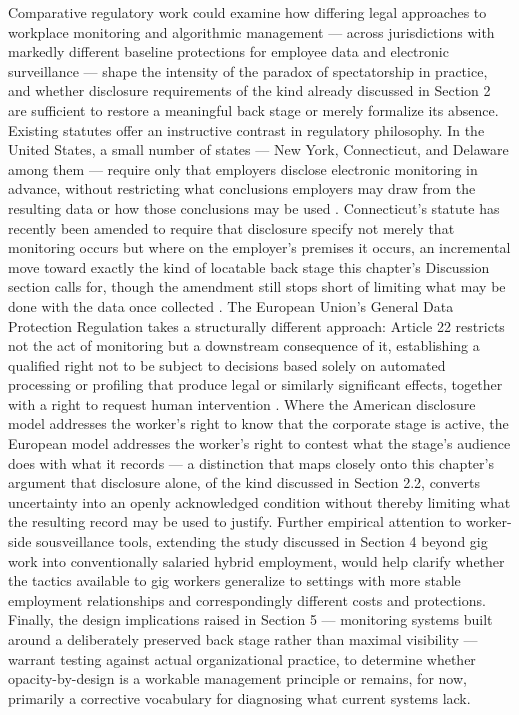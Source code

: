 \documentclass[10pt]{article}
\begin{document}
Comparative regulatory work could examine how differing legal approaches to workplace monitoring and algorithmic management --- across jurisdictions with markedly different baseline protections for employee data and electronic surveillance --- shape the intensity of the paradox of spectatorship in practice, and whether disclosure requirements of the kind already discussed in Section 2 are sufficient to restore a meaningful back stage or merely formalize its absence. Existing statutes offer an instructive contrast in regulatory philosophy. In the United States, a small number of states --- New York, Connecticut, and Delaware among them --- require only that employers disclose electronic monitoring in advance, without restricting what conclusions employers may draw from the resulting data or how those conclusions may be used \cite{nystate,ctstate}. Connecticut's statute has recently been amended to require that disclosure specify not merely that monitoring occurs but where on the employer's premises it occurs, an incremental move toward exactly the kind of locatable back stage this chapter's Discussion section calls for, though the amendment still stops short of limiting what may be done with the data once collected \cite{ctstate}. The European Union's General Data Protection Regulation takes a structurally different approach: Article 22 restricts not the act of monitoring but a downstream consequence of it, establishing a qualified right not to be subject to decisions based solely on automated processing or profiling that produce legal or similarly significant effects, together with a right to request human intervention \cite{eu}. Where the American disclosure model addresses the worker's right to know that the corporate stage is active, the European model addresses the worker's right to contest what the stage's audience does with what it records --- a distinction that maps closely onto this chapter's argument that disclosure alone, of the kind discussed in Section 2.2, converts uncertainty into an openly acknowledged condition without thereby limiting what the resulting record may be used to justify. Further empirical attention to worker-side sousveillance tools, extending the study discussed in Section 4 beyond gig work into conventionally salaried hybrid employment, would help clarify whether the tactics available to gig workers generalize to settings with more stable employment relationships and correspondingly different costs and protections. Finally, the design implications raised in Section 5 --- monitoring systems built around a deliberately preserved back stage rather than maximal visibility --- warrant testing against actual organizational practice, to determine whether opacity-by-design is a workable management principle or remains, for now, primarily a corrective vocabulary for diagnosing what current systems lack.
\end{document}
